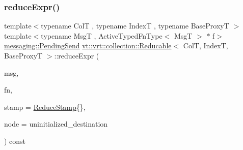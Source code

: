 \subsubsection{\texorpdfstring{reduce\+Expr()}{reduceExpr()}\hspace{0.1cm}{\footnotesize\ttfamily [1/2]}}
{\footnotesize\ttfamily template$<$typename ColT , typename IndexT , typename Base\+ProxyT $>$ \\
template$<$typename MsgT , Active\+Typed\+Fn\+Type$<$ Msg\+T $>$ $\ast$ f$>$ \\
\hyperlink{structvt_1_1messaging_1_1_pending_send}{messaging\+::\+Pending\+Send} \hyperlink{structvt_1_1vrt_1_1collection_1_1_reducable}{vt\+::vrt\+::collection\+::\+Reducable}$<$ ColT, IndexT, Base\+ProxyT $>$\+::reduce\+Expr (\begin{DoxyParamCaption}\item[{MsgT $\ast$const}]{msg,  }\item[{\hyperlink{structvt_1_1vrt_1_1collection_1_1_reducable_a9f5a6c385efafe1fa52937f4809a9486}{Reduce\+Idx\+Func\+Type}}]{fn,  }\item[{\hyperlink{structvt_1_1vrt_1_1collection_1_1_reducable_a19f80baf23f36dad4948ef07322fd0cb}{Reduce\+Stamp}}]{stamp = {\ttfamily \hyperlink{structvt_1_1vrt_1_1collection_1_1_reducable_a19f80baf23f36dad4948ef07322fd0cb}{Reduce\+Stamp}\{\}},  }\item[{\hyperlink{namespacevt_a866da9d0efc19c0a1ce79e9e492f47e2}{Node\+Type} const \&}]{node = {\ttfamily uninitialized\+\_\+destination} }\end{DoxyParamCaption}) const}

\mbox{\label{structvt_1_1vrt_1_1collection_1_1_reducable_a8614291c2fa37b9c714581b2b4bb231f}} 

